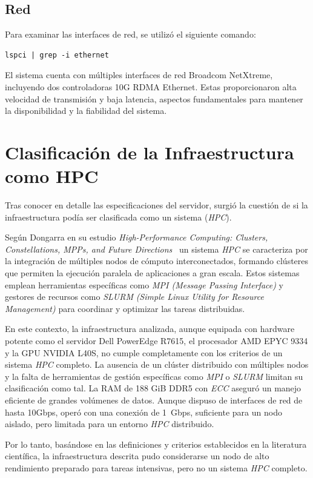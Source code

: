 \subsection*{Red}
Para examinar las interfaces de red, se utilizó el siguiente comando:
\begin{verbatim}
lspci | grep -i ethernet
\end{verbatim}

El sistema cuenta con múltiples interfaces de red Broadcom NetXtreme, incluyendo dos controladoras 10G RDMA Ethernet. Estas proporcionaron alta velocidad de transmisión y baja latencia, aspectos fundamentales para mantener la disponibilidad y la fiabilidad del sistema.


\newpage
\section{Clasificación de la Infraestructura como HPC}
Tras conocer en detalle las especificaciones del servidor, surgió la cuestión de si la infraestructura podía ser clasificada como un sistema (\textit{HPC}).

Según Dongarra en su estudio \textit{High-Performance Computing: Clusters, Constellations, MPPs, and Future Directions}~\cite{ref20} un sistema \textit{HPC} se caracteriza por la integración de múltiples nodos de cómputo interconectados, formando clústeres que permiten la ejecución paralela de aplicaciones a gran escala. Estos sistemas emplean herramientas específicas como \textit{MPI (Message Passing Interface)} y gestores de recursos como \textit{SLURM} \textit{(Simple Linux Utility for Resource Management)} para coordinar y optimizar las tareas distribuidas.

En este contexto, la infraestructura analizada, aunque equipada con hardware potente como el servidor Dell PowerEdge R7615, el procesador AMD EPYC 9334 y la GPU NVIDIA L40S, no cumple completamente con los criterios de un sistema \textit{HPC} completo. La ausencia de un clúster distribuido con múltiples nodos y la falta de herramientas de gestión específicas como \textit{MPI} o \textit{SLURM} limitan su clasificación como tal. La RAM de 188 GiB DDR5 con \textit{ECC} aseguró un manejo eficiente de grandes volúmenes de datos. Aunque dispuso de interfaces de red de hasta 10Gbps, operó con una conexión de 1~Gbps, suficiente para un nodo aislado, pero limitada para un entorno \textit{HPC} distribuido.

Por lo tanto, basándose en las definiciones y criterios establecidos en la literatura científica, la infraestructura descrita pudo considerarse un nodo de alto rendimiento preparado para tareas intensivas, pero no un sistema \textit{HPC} completo.

